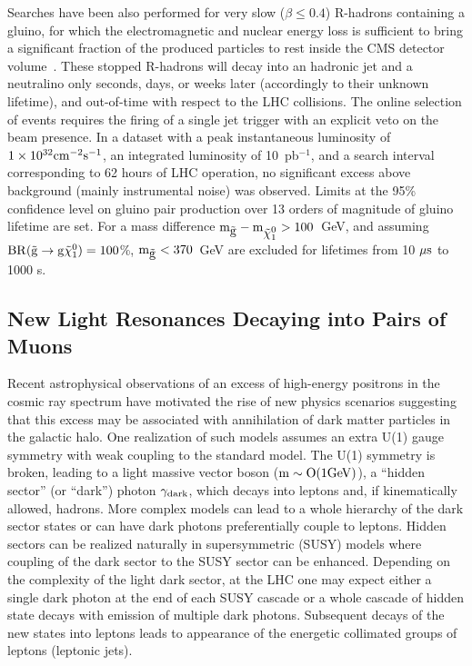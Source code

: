 \documentclass[11pt]{article}
\def\pb{pb$^{-1}$\xspace}
\def\gluino{$\tilde{\rm{g}}$\xspace}
\def\neutralino{$\tilde{\chi}^{0}_{1}$\xspace}
\begin{document}
Searches have been also performed for very slow ($\beta \le 0.4$) R-hadrons containing a gluino, 
for which the electromagnetic and nuclear energy loss is sufficient to bring a significant fraction 
of the produced particles to rest inside the CMS detector volume~\cite{PhysRevLett.106.011801}. 
These stopped R-hadrons will decay into an hadronic jet and a neutralino only seconds, days, or 
weeks later (accordingly to their unknown lifetime), and out-of-time with respect to the LHC collisions. 
The online selection of events requires the firing of a single jet trigger with an explicit veto on the beam presence.
In a dataset with a peak instantaneous luminosity of $1\times 10^{32}\rm{ cm}^{-2}\rm{s}^{-1}$, 
an integrated luminosity of 10~\pb, and a search interval corresponding to 62 hours of LHC operation, 
no significant excess above background (mainly instrumental noise) was observed.  
Limits at the 95\% confidence level on gluino pair production over 13 orders of magnitude of gluino lifetime 
are set. For a mass difference $\rm{m}_{\mbox{\gluino}} - \rm{m}_{\mbox{\neutralino}} > 100$~GeV, and assuming 
$\rm{BR}( \mbox{\gluino} \rightarrow \rm{g} \mbox{\neutralino} ) = 100$\%, $\rm{m}_{\mbox{\gluino}}<370$~GeV 
are excluded for lifetimes from 10 $\mu\rm{s}$ to 1000 s.

\subsection{New Light Resonances Decaying into Pairs of Muons}

Recent astrophysical observations of an excess of high-energy positrons in the cosmic ray 
spectrum have motivated the rise of new physics scenarios suggesting that this excess may 
be associated with annihilation of dark matter particles in the galactic halo.
One realization of such models assumes an extra U(1) gauge symmetry with weak coupling to the 
standard model. The U(1) symmetry is broken, leading to a light massive vector boson 
($\rm{m} \sim O(1 \rm{ GeV})$), a ``hidden sector'' (or ``dark'') photon $\gamma_{\rm{dark}}$, 
which decays into leptons and, if kinematically allowed, hadrons. 
More complex models can lead to a whole hierarchy of the dark sector states or can have 
dark photons preferentially couple to leptons. Hidden sectors can be realized naturally 
in supersymmetric (SUSY) models where coupling of the dark sector to the SUSY sector 
can be enhanced. Depending on the complexity of the light dark sector, at the LHC one may 
expect either a single dark photon at the end of each SUSY cascade or a whole cascade 
of hidden state decays with emission of multiple dark photons. Subsequent decays of the new 
states into leptons leads to appearance of the energetic collimated groups of leptons
(leptonic jets). 
 
\end{document}
